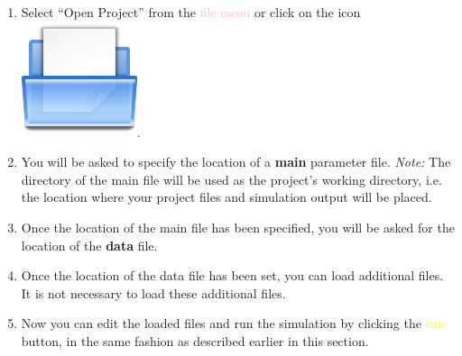 \begin{enumerate}
 \item Select ``Open Project'' from  the \textcolor{pink}{file menu} or click on the icon \includegraphics[scale=0.07]{./figures/GUI/open_icon}.
 \item You will be asked to specify the location of a \textbf{main} parameter file. \emph{Note:} The directory of the main file will be used as the project\textquoteright s working directory, i.e. the location where your project files and simulation output will be placed. 
 \item Once the location of the main file has been specified, you will be asked for the location of the \textbf{data} file.
 \item Once the location of the data file has been set, you can load additional files. It is not necessary to load these additional files. 
 \item Now you can edit the loaded files and run the simulation by clicking the \textcolor{yellow}{run} button, in the same fashion as described earlier in this section.
\end{enumerate}

